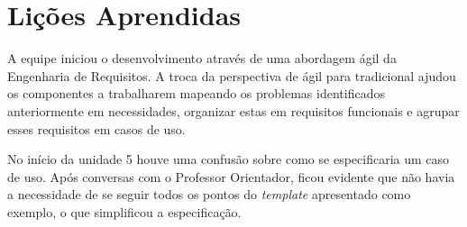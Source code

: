 \documentclass[
	12pt,				%
	oneside,			%
	a4paper,			%
	english,			%
	brazil,				%
	]{abntex2}
\begin{document}
\chapter{Lições Aprendidas}
A equipe iniciou o desenvolvimento através de uma abordagem ágil da Engenharia de Requisitos. A troca da perspectiva de ágil para tradicional ajudou os componentes a trabalharem mapeando os problemas identificados anteriormente em necessidades, organizar estas em requisitos funcionais e agrupar esses requisitos em casos de uso.

No início da unidade 5 houve uma confusão sobre como se especificaria um caso de uso. Após conversas com o Professor Orientador, ficou evidente que não havia a necessidade de se seguir todos os pontos do \textit{template} apresentado como exemplo, o que simplificou a especificação.



\end{document}
